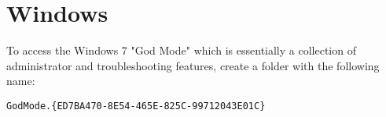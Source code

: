\chapter{Windows}
\thispagestyle{fancy}
\lstset{language=Bash, style=bash}

To access the Windows 7 "God Mode" which is essentially a collection of administrator and troubleshooting features, create a folder with the following name:
\begin{lstlisting}
GodMode.{ED7BA470-8E54-465E-825C-99712043E01C}
\end{lstlisting}